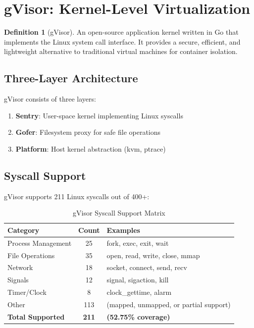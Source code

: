 \documentclass[12pt,twoside,openright]{book}
\theoremstyle{plain}
\theoremstyle{definition}
\newtheorem{definition}[theorem]{Definition}
\theoremstyle{remark}
\begin{document}
\section{gVisor: Kernel-Level Virtualization}

\begin{definition}[gVisor]
An open-source application kernel written in Go that implements the Linux system call interface. It provides a secure, efficient, and lightweight alternative to traditional virtual machines for container isolation.
\end{definition}

\subsection{Three-Layer Architecture}

gVisor consists of three layers:

\begin{enumerate}
  \item \textbf{Sentry}: User-space kernel implementing Linux syscalls
  \item \textbf{Gofer}: Filesystem proxy for safe file operations
  \item \textbf{Platform}: Host kernel abstraction (kvm, ptrace)
\end{enumerate}

\subsection{Syscall Support}

gVisor supports 211 Linux syscalls out of 400+:

\begin{table}[H]
\centering
\begin{tabular}{|l|c|l|}
\hline
\textbf{Category} & \textbf{Count} & \textbf{Examples} \\
\hline
Process Management & 25 & fork, exec, exit, wait \\
\hline
File Operations & 35 & open, read, write, close, mmap \\
\hline
Network & 18 & socket, connect, send, recv \\
\hline
Signals & 12 & signal, sigaction, kill \\
\hline
Timer/Clock & 8 & clock\_gettime, alarm \\
\hline
Other & 113 & (mapped, unmapped, or partial support) \\
\hline
\textbf{Total Supported} & \textbf{211} & \textbf{(52.75\% coverage)} \\
\hline
\end{tabular}
\caption{gVisor Syscall Support Matrix}
\label{tab:syscalls}
\end{table}
\end{document}
